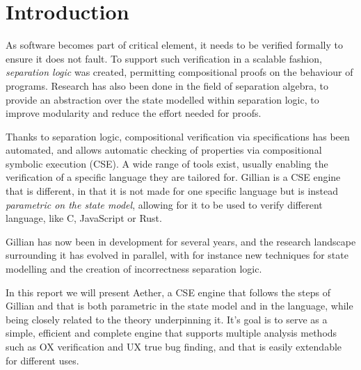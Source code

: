 \chapter{Introduction}

As software becomes part of critical element, it needs to be verified formally to ensure it does not fault. To support such verification in a scalable fashion, \emph{separation logic} \cite{seplogic1, seplogic2} was created, permitting compositional proofs on the behaviour of programs. Research has also been done in the field of separation algebra, to provide an abstraction over the state modelled within separation logic, to improve modularity and reduce the effort needed for proofs.

Thanks to separation logic, compositional verification via specifications has been automated, and allows automatic checking of properties via compositional symbolic execution (CSE). A wide range of tools exist, usually enabling the verification of a specific language they are tailored for. Gillian \cite{gillian0, gillian1, gillian2} is a CSE engine that is different, in that it is not made for one specific language but is instead \emph{parametric on the state model}, allowing for it to be used to verify different language, like C, JavaScript or Rust. 

Gillian has now been in development for several years, and the research landscape surrounding it has evolved in parallel, with for instance new techniques for state modelling and the creation of incorrectness separation logic. 

In this report we will present Aether, a CSE engine that follows the steps of Gillian and that is both parametric in the state model and in the language, while being closely related to the theory underpinning it. It's goal is to serve as a simple, efficient and complete engine that supports multiple analysis methods such as OX verification and UX true bug finding, and that is easily extendable for different uses.